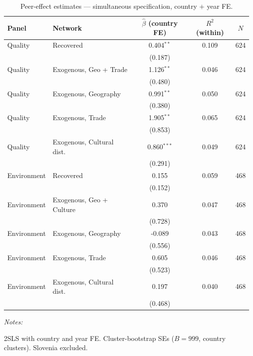 \documentclass[
  letterpaper,
  DIV=11,
  numbers=noendperiod]{scrartcl}
\begin{document}
\begin{table}[!h]
\centering
\caption{\label{tab:tab:bdf_twfe_nolag}Peer-effect estimates — simultaneous specification, country $+$ year FE.}
\centering
\fontsize{9}{11}\selectfont
\begin{threeparttable}
\begin{tabular}[t]{llccc}
\toprule
Panel & Network & $\hat\beta$ (country FE) & $R^2$ (within) & $N$\\
\midrule
Quality & Recovered & 0.404$^{**}$ & 0.109 & 624\\
 &  & (0.187) &  & \\
Quality & Exogenous, Geo + Trade & 1.126$^{**}$ & 0.046 & 624\\
 &  & (0.480) &  & \\
Quality & Exogenous, Geography & 0.991$^{**}$ & 0.050 & 624\\
\addlinespace
 &  & (0.380) &  & \\
Quality & Exogenous, Trade & 1.905$^{**}$ & 0.065 & 624\\
 &  & (0.853) &  & \\
Quality & Exogenous, Cultural dist. & 0.860$^{***}$ & 0.049 & 624\\
 &  & (0.291) &  & \\
\addlinespace
Environment & Recovered & 0.155 & 0.059 & 468\\
 &  & (0.152) &  & \\
Environment & Exogenous, Geo + Culture & 0.370 & 0.047 & 468\\
 &  & (0.728) &  & \\
Environment & Exogenous, Geography & -0.089 & 0.043 & 468\\
\addlinespace
 &  & (0.556) &  & \\
Environment & Exogenous, Trade & 0.605 & 0.046 & 468\\
 &  & (0.523) &  & \\
Environment & Exogenous, Cultural dist. & 0.197 & 0.040 & 468\\
 &  & (0.468) &  & \\
\bottomrule
\end{tabular}
\begin{tablenotes}[para]
\item \textit{Notes:} 
\item 2SLS with country and year FE. Cluster-bootstrap SEs ($B=999$, country clusters). Slovenia excluded.
\end{tablenotes}
\end{threeparttable}
\end{table}
\end{document}
